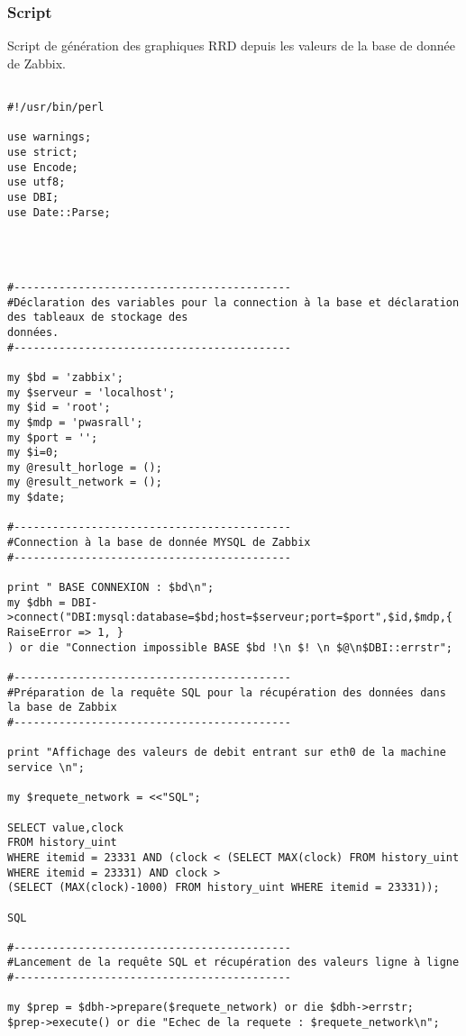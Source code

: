 		\subsubsection{Script}
		\vspace{0.3cm}

Script de génération des graphiques RRD depuis les valeurs de la base de donnée de Zabbix.\\

\begin{verbatim}

#!/usr/bin/perl

use warnings;
use strict;
use Encode;
use utf8;
use DBI;
use Date::Parse;




#-------------------------------------------
#Déclaration des variables pour la connection à la base et déclaration des tableaux de stockage des
données.
#-------------------------------------------

my $bd = 'zabbix';
my $serveur = 'localhost';
my $id = 'root';
my $mdp = 'pwasrall';
my $port = '';
my $i=0;
my @result_horloge = ();
my @result_network = ();
my $date;

#-------------------------------------------
#Connection à la base de donnée MYSQL de Zabbix
#-------------------------------------------

print " BASE CONNEXION : $bd\n";
my $dbh = DBI->connect("DBI:mysql:database=$bd;host=$serveur;port=$port",$id,$mdp,{ RaiseError => 1, }
) or die "Connection impossible BASE $bd !\n $! \n $@\n$DBI::errstr";

#-------------------------------------------
#Préparation de la requête SQL pour la récupération des données dans la base de Zabbix
#-------------------------------------------

print "Affichage des valeurs de debit entrant sur eth0 de la machine service \n";

my $requete_network = <<"SQL"; 

SELECT value,clock
FROM history_uint 
WHERE itemid = 23331 AND (clock < (SELECT MAX(clock) FROM history_uint WHERE itemid = 23331) AND clock >
(SELECT (MAX(clock)-1000) FROM history_uint WHERE itemid = 23331));

SQL

#-------------------------------------------
#Lancement de la requête SQL et récupération des valeurs ligne à ligne
#-------------------------------------------

my $prep = $dbh->prepare($requete_network) or die $dbh->errstr;
$prep->execute() or die "Echec de la requete : $requete_network\n";


\end{verbatim}
